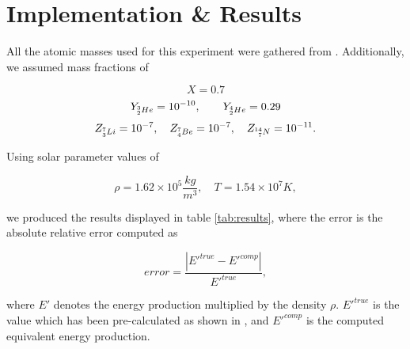 \documentclass[a4paper,10pt,english]{article}
\begin{document}
\section{Implementation \& Results}

All the atomic masses used for this experiment were gathered from \cite{Wang2017}. Additionally, we assumed mass fractions of

$$X = 0.7$$
$$Y_{\prescript{3}{2}{He}} = 10^{-10}, \qquad Y_{\prescript{4}{2}{He}} = 0.29$$
$$Z_{\prescript{7}{3}{Li}} = 10^{-7},\quad Z_{\prescript{7}{4}{Be}} = 10^{-7}, \quad Z_{\prescript{14}{7}{N}} = 10^{-11}.$$

Using solar parameter values of

$$\rho = 1.62\times 10^{5}\frac{kg}{m^3}, \quad T = 1.54\times 10^7 K,$$

we produced the results displayed in table \ref{tab:results}, where the error is the absolute relative error computed as

$$error = \frac{|E'^{true} - E'^{comp}|}{E'^{true}},$$

where $E'$ denotes the energy production multiplied by the density $\rho$. $E'^{true}$ is the value which has been pre-calculated as shown in \cite{Rouppe2020}, and $E'^{comp}$ is the computed equivalent energy production.
\end{document}
